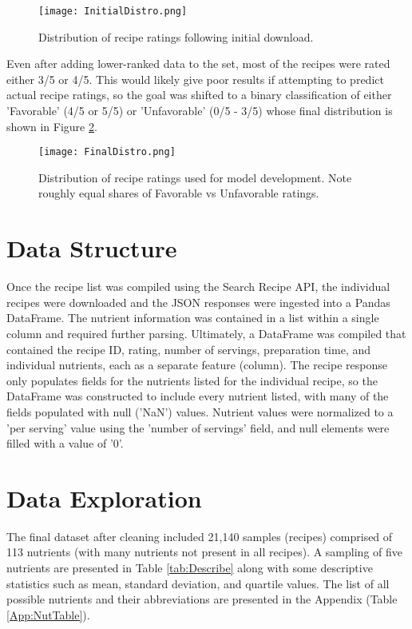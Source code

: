 \documentclass[]{scrartcl}
\begin{document}
\begin{figure}
	\texttt{[image: InitialDistro.png]}
	\caption{Distribution of recipe ratings following initial download.\label{fig:InitDistro}}
\end{figure}


Even after adding lower-ranked data to the set, most of the recipes were rated either 3/5 or 4/5.  This would likely give poor results if attempting to predict actual recipe ratings, so the goal was shifted to a binary classification of either 'Favorable' (4/5 or 5/5) or 'Unfavorable' (0/5 - 3/5) whose final distribution is shown in Figure \ref{fig:FinalDistro}.  

\begin{figure}
	\texttt{[image: FinalDistro.png]}
	\caption{Distribution of recipe ratings used for model development.  Note roughly equal shares of Favorable vs Unfavorable ratings.\label{fig:FinalDistro}}
\end{figure}


\section*{Data Structure}

Once the recipe list was compiled using the Search Recipe API, the individual recipes were downloaded and the JSON responses were ingested into a Pandas DataFrame.  The nutrient information was contained in a list within a single column and required further parsing.  Ultimately, a DataFrame was compiled that contained the recipe ID, rating, number of servings, preparation time, and individual nutrients, each as a separate feature (column).  The recipe response only populates fields for the nutrients listed for the individual recipe, so the DataFrame was constructed to include every nutrient listed, with many of the fields populated with null ('NaN') values.  Nutrient values were normalized to a 'per serving' value using the 'number of servings' field, and null elements were filled with a value of '0'. 

\section*{Data Exploration}

The final dataset after cleaning included 21,140 samples (recipes) comprised of 113 nutrients (with many nutrients not present in all recipes).  A sampling of five nutrients are presented in Table \ref{tab:Describe} along with some descriptive statistics such as mean, standard deviation, and quartile values.  The list of all possible nutrients and their abbreviations are presented in the Appendix (Table \ref{App:NutTable}).
\end{document}
